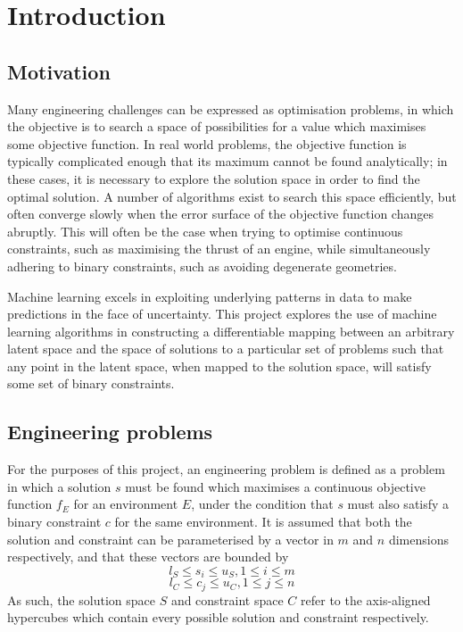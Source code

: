 \documentclass[../../main.tex]{subfiles}
\begin{document}
\chapter{Introduction}

\section{Motivation}

Many engineering challenges can be expressed as optimisation problems, in which the objective is to search a space of possibilities for a value which maximises some objective function.
In real world problems, the objective function is typically complicated enough that its maximum cannot be found analytically; in these cases, it is necessary to explore the solution space in order to find the optimal solution.
A number of algorithms exist to search this space efficiently, but often converge slowly when the error surface of the objective function changes abruptly.
This will often be the case when trying to optimise continuous constraints, such as maximising the thrust of an engine, while simultaneously adhering to binary constraints, such as avoiding degenerate geometries.

Machine learning excels in exploiting underlying patterns in data to make predictions in the face of uncertainty.
This project explores the use of machine learning algorithms in constructing a differentiable mapping between an arbitrary latent space and the space of solutions to a particular set of problems such that any point in the latent space, when mapped to the solution space, will satisfy some set of binary constraints.

\section{Engineering problems}

For the purposes of this project, an engineering problem is defined as a problem in which a solution $s$ must be found which maximises a continuous objective function $f_E$ for an environment $E$, under the condition that $s$ must also satisfy a binary constraint $c$ for the same environment.
It is assumed that both the solution and constraint can be parameterised by a vector in $m$ and $n$ dimensions respectively, and that these vectors are bounded by
$$l_S \le s_i \le u_S, 1 \le i \le m$$
$$l_C \le c_j \le u_C, 1 \le j \le n$$
As such, the solution space $S$ and constraint space $C$ refer to the axis-aligned hypercubes which contain every possible solution and constraint respectively.
\end{document}
